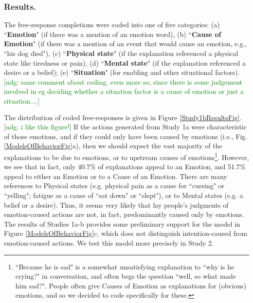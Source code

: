 \documentclass[10pt,letterpaper]{article}
\newcommand{\ndg}[1]{\textcolor{Green}{[ndg: #1]}}
\begin{document}
\subsubsection{Results.} 
The free-response completions were coded into one of five categories: (a) ``\textbf{Emotion}" (if there was a mention of an emotion word), (b) ``\textbf{Cause of Emotion}" (if there was a mention of an event that would cause an emotion, e.g., ``his dog died"), (c) ``\textbf{Physical state}" (if the explanation referenced a physical state like tiredness or pain), (d) ``\textbf{Mental state}" (if the explanation referenced a desire or a belief); (e) ``\textbf{Situation}" (for enabling and other situational factors). 
\ndg{same comment about coding. even more so, since there is some judgement involved in eg deciding whether a situation factor is a cause of emotion or just a situation....}

The distribution of coded free-responses is given in Figure \ref{Study1bResultsFig}. \ndg{i like this figure!}
If the actions generated from Study 1a were characteristic of those emotions, and if they could only have been caused by emotions (i.e., Fig. \ref{ModelsOfBehaviorFig}a), then we should expect the vast majority of the explanations to be due to emotions, or to upstream causes of emotions\footnote{``Because he is sad" is a somewhat unsatisfying explanation to ``why is he crying?" in conversation, and often begs the question ``well, so what made him sad?". People often give Causes of Emotion as explanations for (obvious) emotions, and so we decided to code specifically for these.}. However, we see that in fact, only 40.7\% of explanations appeal to an Emotion, and 51.7\% appeal to either an Emotion or to a Cause of an Emotion. There are many references to Physical states (e.g. physical pain as a cause for ``cursing" or ``yelling"; fatigue as a cause of ``sat down" or ``slept"), or to Mental states (e.g. a belief or a desire). Thus, it seems very likely that lay people's judgments of emotion-caused actions are not, in fact, predominantly caused only by emotions. 
The results of Studies 1a-b provides some preliminary support for the model in Figure \ref{ModelsOfBehaviorFig}c, which does not distinguish intention-caused from emotion-caused actions. 
We test this model more precisely in Study 2.
\end{document}
